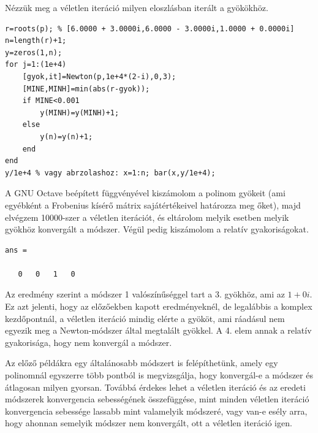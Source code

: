 \documentclass[a4paper,12pt]{report}
\begin{document}
				Nézzük meg a véletlen iteráció milyen eloszlásban iterált a gyökökhöz.
                \begin{singlespace}
				\begin{lstlisting}[caption=Bemenet]
r=roots(p); % [6.0000 + 3.0000i,6.0000 - 3.0000i,1.0000 + 0.0000i]
n=length(r)+1;
y=zeros(1,n);
for j=1:(1e+4)
	[gyok,it]=Newton(p,1e+4*(2-i),0,3);
	[MINE,MINH]=min(abs(r-gyok));
	if MINE<0.001
		y(MINH)=y(MINH)+1;
	else
		y(n)=y(n)+1;
	end
end
y/1e+4 % vagy abrzolashoz: x=1:n; bar(x,y/1e+4);
				\end{lstlisting}
                \end{singlespace}
				A GNU Octave beépített függvényével kiszámolom a polinom gyökeit (ami egyébként a Frobenius kísérő mátrix sajátértékeivel határozza meg őket), majd elvégzem 10000-szer a véletlen iterációt, és eltárolom melyik esetben melyik gyökhöz konvergált a módszer. Végül pedig kiszámolom a relatív gyakoriságokat.
				\begin{singlespace}
                \begin{lstlisting}[caption= Eredm\'eny]
ans =

   0   0   1   0
				\end{lstlisting}
                \end{singlespace}
                Az eredmény szerint a módszer 1 valószínűséggel tart a 3. gyökhöz, ami az $1+0i$. Ez azt jelenti, hogy az előzőekben kapott eredményeknél, de legalábbis a komplex kezdőpontnál, a véletlen iteráció mindig elérte a gyököt, ami ráadásul nem egyezik meg a Newton-módszer által megtalált gyökkel. A 4. elem annak a relatív gyakorisága, hogy nem konvergál a módszer.

				Az előző példákra egy általánosabb módszert is felépíthetünk, amely egy polinomnál egyszerre több pontból is megvizsgálja, hogy konvergál-e a módszer és átlagosan milyen gyorsan. Továbbá érdekes lehet a véletlen iteráció és az eredeti módszerek konvergencia sebességének összefüggése, mint minden véletlen iteráció konvergencia sebessége lassabb mint valamelyik módszeré, vagy van-e esély arra, hogy ahonnan semelyik módszer nem konvergált, ott a véletlen iteráció igen.
\end{document}
